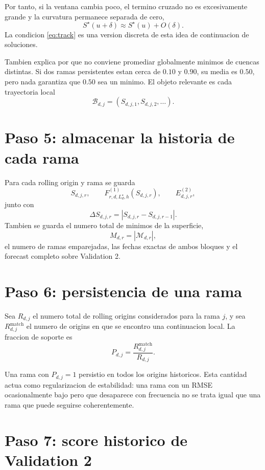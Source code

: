 \documentclass[11pt]{article}
\begin{document}
Por tanto, si la ventana cambia poco, el termino cruzado no es excesivamente
grande y la curvatura permanece separada de cero,
\[
S^\star(u+\delta)
\approx
S^\star(u)+O(\delta).
\]
La condicion \eqref{eq:track} es una version discreta de esta idea de
continuacion de soluciones.

Tambien explica por que no conviene promediar globalmente minimos de cuencas
distintas. Si dos ramas persistentes estan cerca de \(0.10\) y \(0.90\), su
media es \(0.50\), pero nada garantiza que \(0.50\) sea un minimo. El objeto
relevante es cada trayectoria local
\[
\mathcal{B}_{d,j}
=
(S_{d,j,1},S_{d,j,2},\ldots).
\]

\section{Paso 5: almacenar la historia de cada rama}

Para cada rolling origin y rama se guarda
\[
S_{d,j,r},
\qquad
F^{(1)}_{r,d,L_d^\star,h}(S_{d,j,r}),
\qquad
E^{(2)}_{d,j,r},
\]
junto con
\[
\Delta S_{d,j,r}
=
|S_{d,j,r}-S_{d,j,r-1}|.
\]
Tambien se guarda el numero total de minimos de la superficie,
\[
M_{d,r}=|\mathcal{M}_{d,r}|,
\]
el numero de ramas emparejadas, las fechas exactas de ambos bloques y el
forecast completo sobre Validation 2.

\section{Paso 6: persistencia de una rama}

Sea \(R_{d,j}\) el numero total de rolling origins considerados para la rama
\(j\), y sea \(R^{\mathrm{match}}_{d,j}\) el numero de origins en que se encontro
una continuacion local. La fraccion de soporte es
\begin{equation}
P_{d,j}
=
\frac{R^{\mathrm{match}}_{d,j}}{R_{d,j}}.
\label{eq:support}
\end{equation}

Una rama con \(P_{d,j}=1\) persistio en todos los origins historicos. Esta
cantidad actua como regularizacion de estabilidad: una rama con un RMSE
ocasionalmente bajo pero que desaparece con frecuencia no se trata igual que
una rama que puede seguirse coherentemente.

\section{Paso 7: score historico de Validation 2}
\end{document}

